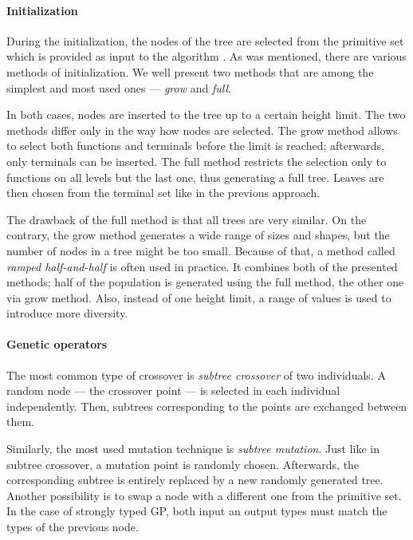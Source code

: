 \paragraph{Initialization}
During the initialization, the nodes of the tree are selected from the
primitive set which is provided as input to the algorithm
\citep{Koza:1992:GPP:138936}. As was mentioned, there are various methods of 
initialization. We well present two methods that are among the simplest and 
most used ones --- \emph{grow} and \emph{full}.

In both cases, nodes are inserted to the tree up to a certain height limit.
The two methods differ only in the way how nodes are selected. The grow method
allows to select both functions and terminals before the limit is reached;
afterwards, only terminals can be inserted. The full method restricts the
selection only to functions on all levels but the last one, thus generating 
a full tree. Leaves are then
chosen from the terminal set like in the previous approach.

The drawback of the full method is that all trees are very similar. On the
contrary, the grow method generates a wide range of sizes and shapes, but the
number of nodes in a tree might be too small. Because of that, a method called
\emph{ramped half-and-half} is often used in practice. It combines both 
of the presented methods; half of the population is generated using the full
method, the other one via grow method. Also, instead of one height limit, a
range of values is used to introduce more diversity.
\citep{Poli:2008:FGG:1796422}

\paragraph{Genetic operators}
The most common type of crossover is \emph{subtree crossover} of two
individuals. A random node --- the crossover point ---
is selected in each individual independently. Then, subtrees corresponding
to the points are exchanged between them.

Similarly, the most used mutation technique is \emph{subtree mutation}.
Just like in subtree crossover, a mutation point is randomly chosen.
Afterwards, the corresponding subtree is entirely replaced by a new randomly
generated tree. Another possibility is to swap a node with a different one
from the primitive set. In the case of strongly typed GP, both input an output
types must match the types of the previous node.
\citep{Poli:2008:FGG:1796422}

